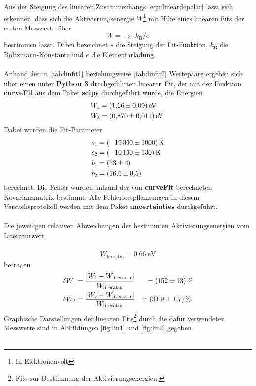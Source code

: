 Aus der Steigung des linearen Zusammenhangs \eqref{eqn:lineardepolar} lässt sich erkennen, dass sich
die Aktivierungsenergie $W$\footnote{In Elektronenvolt} mit Hilfe eines linearen Fits der ersten Messwerte über
\\
\begin{equation}
  \label{eqn:W}
  W = -s \cdot k_\text{B} / e
\end{equation}
bestimmen lässt. Dabei bezeichnet $s$ die Steigung der Fit-Funktion, $k_\text{B}$ die Boltzmann-Konstante und $e$ die Elementarladung.\\ \\
Anhand der in \ref{tab:linfit1} beziehungweise \ref{tab:linfit2} Wertepaare ergeben sich über einen unter \textbf{Python 3}
durchgeführten linearen Fit, der mit der Funktion \textbf{curveFit} aus
dem Paket \textbf{scipy} durchgeführt wurde, die Energien
\\
\begin{align*}
  W_{1} &= \SI{1.66+-0.09}{\electronvolt} \\
  W_{2} &= \SI{0.870+-0.011}{\electronvolt}.
\end{align*}
Dabei wurden die Fit-Parameter
\\
\begin{align*}
  s_{1} &= \SI{-19300+-1000}{\kelvin}\\
  s_{2} &= \SI{-10100+-130}{\kelvin}\\
  b_{1} &= \SI{53+-4}{}\\
  b_{2} &= \SI{16.6+-0.5}{}
\end{align*}
berechnet.
Die Fehler wurden anhand der von \textbf{curveFit} berechneten Kovarianzmatrix bestimmt. Alle Fehlerfortpflanzungen in diesem Versuchsprotokoll
werden mit dem Paket \textbf{uncertainties}\cite{uncertainties} durchgeführt.\\ \\
Die jeweiligen relativen Abweichungen der bestimmten Aktivierungsenergien vom Literaturwert \cite{literaturwert}\\ \\
\begin{align*}
  W_\text{literatur} = \SI{0.66}{\electronvolt}
\end{align*}
betragen
\begin{align*}
  \delta W_{1} &= \frac{\lvert W_{1} - W_\text{literatur} \rvert}{W_\text{literatur}} &= \SI{152+-13}{\percent}\\
  \delta W_{2} &= \frac{\lvert W_{2} - W_\text{literatur} \rvert}{W_\text{literatur}} &= \SI{31.9+-1.7}{\percent} .
\end{align*}
Graphische Darstellungen der linearen Fits\footnote{Fits zur Bestimmung der Aktivierungsenergien.} durch die dafür verwendeten Messwerte
sind in Abbildungen \ref{fig:lin1} und \ref{fig:lin2} gegeben.\\ \\


